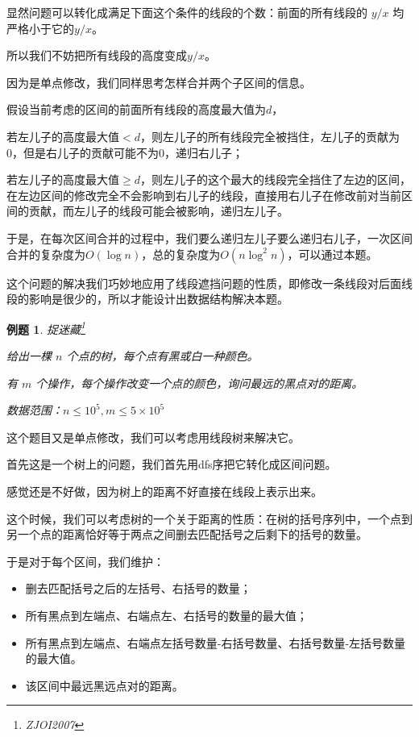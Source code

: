 \documentclass[a4paper]{article}
\newtheorem{problem}{例题}
\begin{document}
显然问题可以转化成满足下面这个条件的线段的个数：前面的所有线段的 $y/x$ 均严格小于它的$y/x$。

所以我们不妨把所有线段的高度变成$y/x$。

因为是单点修改，我们同样思考怎样合并两个子区间的信息。

假设当前考虑的区间的前面所有线段的高度最大值为$d$，

若左儿子的高度最大值$<d$，则左儿子的所有线段完全被挡住，左儿子的贡献为0，但是右儿子的贡献可能不为0，递归右儿子；

若左儿子的高度最大值$\geq d$，则左儿子的这个最大的线段完全挡住了左边的区间，在左边区间的修改完全不会影响到右儿子的线段，直接用右儿子在修改前对当前区间的贡献，而左儿子的线段可能会被影响，递归左儿子。

于是，在每次区间合并的过程中，我们要么递归左儿子要么递归右儿子，一次区间合并的复杂度为$O(\log n)$，总的复杂度为$O(n\log^2 n)$，可以通过本题。

这个问题的解决我们巧妙地应用了线段遮挡问题的性质，即修改一条线段对后面线段的影响是很少的，所以才能设计出数据结构解决本题。

\begin{problem}
  捉迷藏\footnote{ZJOI2007}

  给出一棵 $n$ 个点的树，每个点有黑或白一种颜色。

  有 $m$ 个操作，每个操作改变一个点的颜色，询问最远的黑点对的距离。

  数据范围：$n\leq 10^5, m\leq 5\times 10^5$
\end{problem}

这个题目又是单点修改，我们可以考虑用线段树来解决它。

首先这是一个树上的问题，我们首先用dfs序把它转化成区间问题。

感觉还是不好做，因为树上的距离不好直接在线段上表示出来。

这个时候，我们可以考虑树的一个关于距离的性质：在树的括号序列中，一个点到另一个点的距离恰好等于两点之间删去匹配括号之后剩下的括号的数量。

\newpage

于是对于每个区间，我们维护：

\begin{itemize}
  \item 删去匹配括号之后的左括号、右括号的数量；
  \item 所有黑点到左端点、右端点左、右括号的数量的最大值；
  \item 所有黑点到左端点、右端点左括号数量-右括号数量、右括号数量-左括号数量的最大值。
  \item 该区间中最远黑远点对的距离。
\end{itemize}
\end{document}
